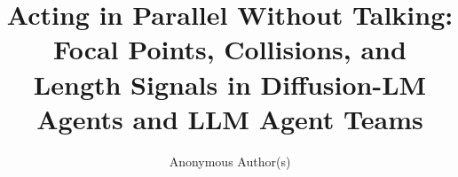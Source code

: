 \documentclass[sigconf,anonymous]{aamas}
\title[Acting in Parallel Without Talking]{Acting in Parallel Without Talking: Focal Points, Collisions, and Length Signals in Diffusion-LM Agents and LLM Agent Teams}
\author{Anonymous Author(s)}
\affiliation{
  \institution{Anonymous Institution}
  \city{Anonymous City}
  \country{Anonymous Country}}
\begin{document}


\maketitle













\balance


\end{document}

